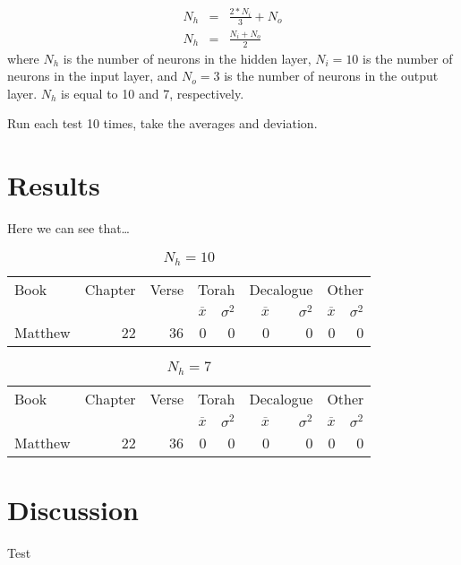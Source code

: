 \documentclass{article}
\begin{document}
\begin{eqnarray}
    N_h & = & \frac{2 * N_i}{3} + N_o\\
    N_h & = & \frac{N_i + N_o}{2}
\end{eqnarray}
where $N_h$ is the number of neurons in the hidden layer, $N_i = 10$ is the number of neurons in the input
layer, and $N_o = 3$ is the number of neurons in the output layer.  $N_h$ is equal to 10 and 7, respectively.

Run each test 10 times, take the averages and deviation.

\section{Results}
Here we can see that\ldots

\begin{table}
    \centering
    \renewcommand\arraystretch{1.3}
    \begin{tabular}{@{}lrrrrrrrr@{}}
    \toprule
        Book & Chapter & Verse & \multicolumn{2}{c}{Torah} & \multicolumn{2}{c}{Decalogue} & \multicolumn{2}{c}{Other} \\
        \cmidrule{4-5} \cmidrule{6-7} \cmidrule{8-9} & & & $\overline{x}$ & $\sigma^2$ & $\overline{x}$ & $\sigma^2$ & $\overline{x}$ & $\sigma^2$ \\
    \midrule
        Matthew & 22 & 36 & 0 & 0 & 0 & 0 & 0 & 0 \\
    \bottomrule
    \end{tabular}
    \caption{$N_h = 10$}
    \label{N_h10}
\end{table}

\begin{table}
    \centering
    \renewcommand\arraystretch{1.3}
    \begin{tabular}{@{}lrrrrrrrr@{}}
    \toprule
        Book & Chapter & Verse & \multicolumn{2}{c}{Torah} & \multicolumn{2}{c}{Decalogue} & \multicolumn{2}{c}{Other} \\
        \cmidrule{4-5} \cmidrule{6-7} \cmidrule{8-9} & & & $\overline{x}$ & $\sigma^2$ & $\overline{x}$ & $\sigma^2$ & $\overline{x}$ & $\sigma^2$ \\
    \midrule
        Matthew & 22 & 36 & 0 & 0 & 0 & 0 & 0 & 0 \\
    \bottomrule
    \end{tabular}
    \caption{$N_h = 7$}
    \label{N_h7}
\end{table}

\section{Discussion}
Test

\printbibliography
\end{document}
